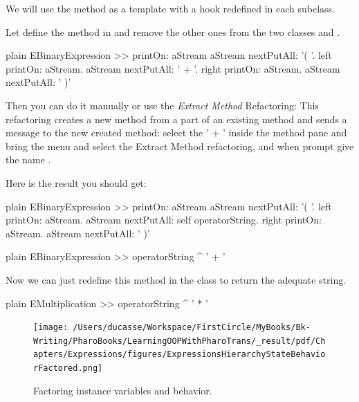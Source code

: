 \documentclass[10pt,twoside,english]{_support/latex/sbabook/sbabook}
\begin{document}
We will use the method  as a template with a hook redefined in each subclass.

Let define the method  in  and remove the other ones from the two classes  and . 

\begin{displaycode}{plain}
EBinaryExpression >> printOn: aStream
	aStream nextPutAll: '( '.
	left printOn: aStream. 
	aStream nextPutAll: ' + '.
	right printOn: aStream.
	aStream nextPutAll: ' )'
\end{displaycode}

Then you can do it manually or use the \textit{Extract Method} Refactoring: This refactoring creates a new method from a part of an existing method and sends a message to the new created method: select the ' + ' inside the method pane and bring the menu and select the Extract Method refactoring, and when prompt give the name . 

Here is the result you should get:  

\begin{displaycode}{plain}
EBinaryExpression >> printOn: aStream
	aStream nextPutAll: '( '.
	left printOn: aStream.
	aStream nextPutAll: self operatorString.
	right printOn: aStream.
	aStream nextPutAll: ' )'
\end{displaycode}

\begin{displaycode}{plain}
EBinaryExpression >> operatorString
	^ ' + '
\end{displaycode}

Now we can just redefine this method in the  class to return the adequate string.

\begin{displaycode}{plain}
EMultiplication >> operatorString
	^ ' * '
\end{displaycode}


\begin{figure}

\begin{center}
\texttt{[image: /Users/ducasse/Workspace/FirstCircle/MyBooks/Bk-Writing/PharoBooks/LearningOOPWithPharoTrans/\_result/pdf/Chapters/Expressions/figures/ExpressionsHierarchyStateBehaviorFactored.png]}\caption{Factoring instance variables and behavior.\label{figExpressionsHierarchyStateBehaviorFactored}}\end{center}
\end{figure}
\end{document}
